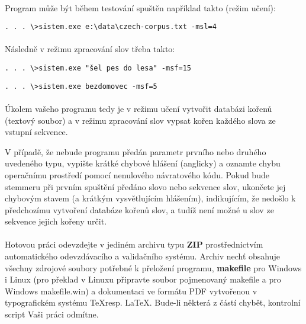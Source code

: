 ﻿\documentclass[12pt, a4paper]{article}
\begin{document}
\paragraph{}
Program může být během testování spuštěn například takto (režim učení):
\begin{verbatim}
. . . \>sistem.exe e:\data\czech-corpus.txt -msl=4
\end{verbatim}

\paragraph{}
Následně v režimu zpracování slov třeba takto:
\begin{verbatim}
. . . \>sistem.exe "šel pes do lesa" -msf=15
\end{verbatim}
\begin{verbatim}
. . . \>sistem.exe bezdomovec -msf=5
\end{verbatim}

\paragraph{}
Úkolem vašeho programu tedy je v režimu učení vytvořit databázi kořenů (textový soubor) a v režimu zpracování slov vypsat kořen každého slova ze vstupní sekvence. 

V případě, že nebude programu předán parametr prvního nebo druhého uvedeného typu, vypište krátké chybové hlášení (anglicky) a oznamte chybu operačnímu prostředí pomocí nenulového návratového kódu. Pokud bude stemmeru při prvním spuštění předáno slovo nebo sekvence slov, ukončete jej chybovým stavem (a krátkým vysvětlujícím hlášením), indikujícím, že nedošlo k předchozímu vytvoření databáze kořenů slov, a tudíž není možné u slov ze sekvence jejich kořeny určit.

\paragraph{}
Hotovou práci odevzdejte v jediném archivu typu \textbf{ZIP} prostřednictvím automatického odevzdávacího a validačního systému. Archiv nechť obsahuje všechny zdrojové soubory potřebné k přeložení programu, \textbf{makefile} pro Windows i Linux (pro překlad v Linuxu připravte soubor pojmenovaný makefile a pro Windows makefile.win) a dokumentaci ve formátu PDF vytvořenou v typografickém systému \TeX  resp. \LaTeX. Bude-li některá z částí chybět, kontrolní script Vaši práci odmítne.
\end{document}
